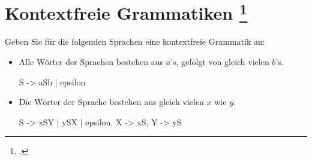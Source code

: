 \documentclass{lehramt-informatik-aufgabe}
\begin{document}
\section{Kontextfreie Grammatiken
\footcite{theo:ab:2}}

Geben Sie für die folgenden Sprachen eine kontextfreie Grammatik an:

\begin{itemize}

%

\item Alle Wörter der Sprachen bestehen aus $a$’s, gefolgt von gleich
vielen $b$’s.

\begin{liAntwort}
\begin{liProduktionsRegeln}
S -> aSb | epsilon
\end{liProduktionsRegeln}
\end{liAntwort}

%

\item Die Wörter der Sprache bestehen aus gleich vielen $x$ wie $y$.

\begin{liAntwort}
\begin{liProduktionsRegeln}
S -> xSY | ySX | epsilon,
X -> xS,
Y -> yS
\end{liProduktionsRegeln}
\end{liAntwort}
\end{itemize}
\end{document}
